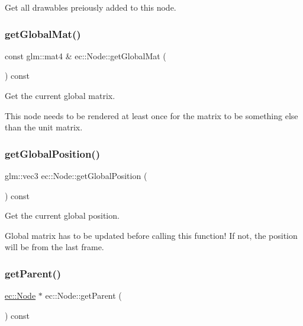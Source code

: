 Get all drawables preiously added to this node. 

\mbox{\label{classec_1_1_node_aecf550ed169a643bd9c23979377d8afc}} 
\subsubsection{\texorpdfstring{get\+Global\+Mat()}{getGlobalMat()}}
{\footnotesize\ttfamily const glm\+::mat4 \& ec\+::\+Node\+::get\+Global\+Mat (\begin{DoxyParamCaption}{ }\end{DoxyParamCaption}) const}



Get the current global matrix. 

This node needs to be rendered at least once for the matrix to be something else than the unit matrix. \mbox{\label{classec_1_1_node_ab4072f05f2b51e3d76f67e8557fc2134}} 
\subsubsection{\texorpdfstring{get\+Global\+Position()}{getGlobalPosition()}}
{\footnotesize\ttfamily glm\+::vec3 ec\+::\+Node\+::get\+Global\+Position (\begin{DoxyParamCaption}{ }\end{DoxyParamCaption}) const}



Get the current global position. 

Global matrix has to be updated before calling this function! If not, the position will be from the last frame. \mbox{\label{classec_1_1_node_ae1f93035b3df9db7a24afc06a7526dab}} 
\subsubsection{\texorpdfstring{get\+Parent()}{getParent()}}
{\footnotesize\ttfamily \mbox{\hyperlink{classec_1_1_node}{ec\+::\+Node}} $\ast$ ec\+::\+Node\+::get\+Parent (\begin{DoxyParamCaption}{ }\end{DoxyParamCaption}) const}



